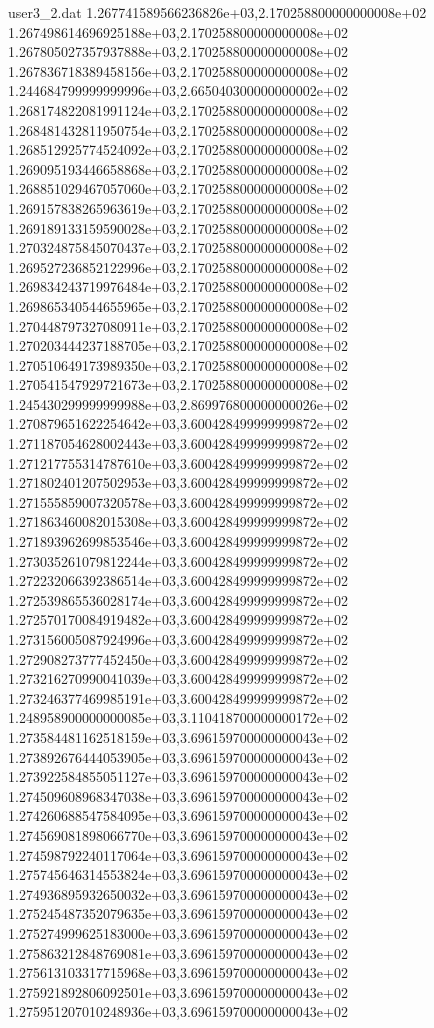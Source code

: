\begin{filecontents}{user3_2.dat}
1.267741589566236826e+03,2.170258800000000008e+02
1.267498614696925188e+03,2.170258800000000008e+02
1.267805027357937888e+03,2.170258800000000008e+02
1.267836718389458156e+03,2.170258800000000008e+02
1.244684799999999996e+03,2.665040300000000002e+02
1.268174822081991124e+03,2.170258800000000008e+02
1.268481432811950754e+03,2.170258800000000008e+02
1.268512925774524092e+03,2.170258800000000008e+02
1.269095193446658868e+03,2.170258800000000008e+02
1.268851029467057060e+03,2.170258800000000008e+02
1.269157838265963619e+03,2.170258800000000008e+02
1.269189133159590028e+03,2.170258800000000008e+02
1.270324875845070437e+03,2.170258800000000008e+02
1.269527236852122996e+03,2.170258800000000008e+02
1.269834243719976484e+03,2.170258800000000008e+02
1.269865340544655965e+03,2.170258800000000008e+02
1.270448797327080911e+03,2.170258800000000008e+02
1.270203444237188705e+03,2.170258800000000008e+02
1.270510649173989350e+03,2.170258800000000008e+02
1.270541547929721673e+03,2.170258800000000008e+02
1.245430299999999988e+03,2.869976800000000026e+02
1.270879651622254642e+03,3.600428499999999872e+02
1.271187054628002443e+03,3.600428499999999872e+02
1.271217755314787610e+03,3.600428499999999872e+02
1.271802401207502953e+03,3.600428499999999872e+02
1.271555859007320578e+03,3.600428499999999872e+02
1.271863460082015308e+03,3.600428499999999872e+02
1.271893962699853546e+03,3.600428499999999872e+02
1.273035261079812244e+03,3.600428499999999872e+02
1.272232066392386514e+03,3.600428499999999872e+02
1.272539865536028174e+03,3.600428499999999872e+02
1.272570170084919482e+03,3.600428499999999872e+02
1.273156005087924996e+03,3.600428499999999872e+02
1.272908273777452450e+03,3.600428499999999872e+02
1.273216270990041039e+03,3.600428499999999872e+02
1.273246377469985191e+03,3.600428499999999872e+02
1.248958900000000085e+03,3.110418700000000172e+02
1.273584481162518159e+03,3.696159700000000043e+02
1.273892676444053905e+03,3.696159700000000043e+02
1.273922584855051127e+03,3.696159700000000043e+02
1.274509608968347038e+03,3.696159700000000043e+02
1.274260688547584095e+03,3.696159700000000043e+02
1.274569081898066770e+03,3.696159700000000043e+02
1.274598792240117064e+03,3.696159700000000043e+02
1.275745646314553824e+03,3.696159700000000043e+02
1.274936895932650032e+03,3.696159700000000043e+02
1.275245487352079635e+03,3.696159700000000043e+02
1.275274999625183000e+03,3.696159700000000043e+02
1.275863212848769081e+03,3.696159700000000043e+02
1.275613103317715968e+03,3.696159700000000043e+02
1.275921892806092501e+03,3.696159700000000043e+02
1.275951207010248936e+03,3.696159700000000043e+02

\end{filecontents}
